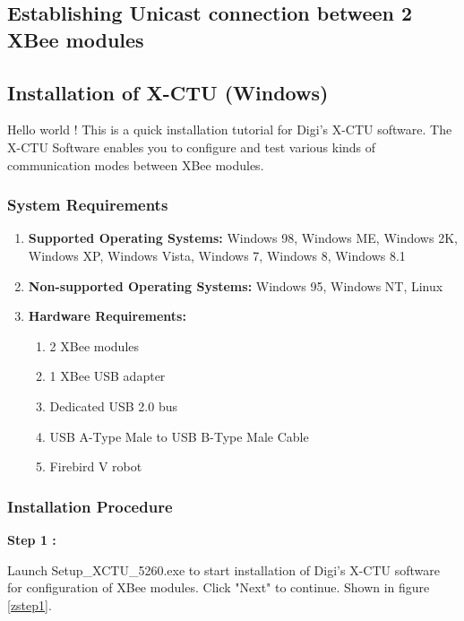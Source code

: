 
\begin{flushleft}

\chapter{Establishing Unicast connection between 2 XBee modules}


\medskip
\section{\textbf{Installation of X-CTU (Windows)}}
\medskip
Hello world ! This is a quick installation tutorial for Digi's X-CTU software.
The X-CTU Software enables you to configure and test various kinds of communication modes between XBee modules.
\medskip
\subsection{\textbf{ System Requirements}}
\medskip
\begin{enumerate}
\item \textbf{Supported Operating Systems:} Windows 98, Windows ME, Windows 2K, Windows XP, Windows Vista, Windows 7, Windows 8, Windows 8.1

\item \textbf{Non-supported Operating Systems:} Windows 95, Windows NT, Linux

\item \textbf{Hardware Requirements:} 
\begin{enumerate}
\item 2 XBee modules
\item 1 XBee USB adapter 
\item Dedicated USB 2.0 bus
\item USB A-Type Male to USB B-Type Male Cable
\item Firebird V robot
\end{enumerate}
\end{enumerate}
\medskip

\subsection{\textbf{ Installation Procedure}}
\textbf{Step 1 :}

\medskip

Launch Setup\_XCTU\_5260.exe to start installation of Digi's X-CTU software for configuration of XBee modules. Click "Next" to continue. Shown in figure \ref{zstep1}. 


\end{flushleft}

